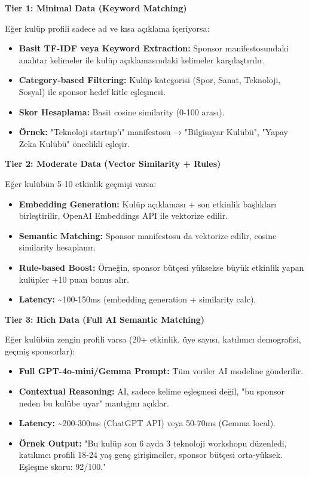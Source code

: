 \documentclass[a4paper,12pt]{report}
\begin{document}
\textbf{Tier 1: Minimal Data (Keyword Matching)}

Eğer kulüp profili sadece ad ve kısa açıklama içeriyorsa:
\begin{itemize}
    \item \textbf{Basit TF-IDF veya Keyword Extraction:} Sponsor manifestosundaki anahtar kelimeler ile kulüp açıklamasındaki kelimeler karşılaştırılır.
    \item \textbf{Category-based Filtering:} Kulüp kategorisi (Spor, Sanat, Teknoloji, Sosyal) ile sponsor hedef kitle eşleşmesi.
    \item \textbf{Skor Hesaplama:} Basit cosine similarity (0-100 arası).
    \item \textbf{Örnek:} "Teknoloji startup'ı" manifestosu → "Bilgisayar Kulübü", "Yapay Zeka Kulübü" öncelikli eşleşir.
\end{itemize}

\textbf{Tier 2: Moderate Data (Vector Similarity + Rules)}

Eğer kulübün 5-10 etkinlik geçmişi varsa:
\begin{itemize}
    \item \textbf{Embedding Generation:} Kulüp açıklaması + son etkinlik başlıkları birleştirilir, OpenAI Embeddings API ile vektorize edilir.
    \item \textbf{Semantic Matching:} Sponsor manifestosu da vektorize edilir, cosine similarity hesaplanır.
    \item \textbf{Rule-based Boost:} Örneğin, sponsor bütçesi yüksekse büyük etkinlik yapan kulüpler +10 puan bonus alır.
    \item \textbf{Latency:} \textasciitilde{}100-150ms (embedding generation + similarity calc).
\end{itemize}

\textbf{Tier 3: Rich Data (Full AI Semantic Matching)}

Eğer kulübün zengin profili varsa (20+ etkinlik, üye sayısı, katılımcı demografisi, geçmiş sponsorlar):
\begin{itemize}
    \item \textbf{Full GPT-4o-mini/Gemma Prompt:} Tüm veriler AI modeline gönderilir.
    \item \textbf{Contextual Reasoning:} AI, sadece kelime eşleşmesi değil, "bu sponsor neden bu kulübe uyar" mantığını açıklar.
    \item \textbf{Latency:} \textasciitilde{}200-300ms (ChatGPT API) veya 50-70ms (Gemma local).
    \item \textbf{Örnek Output:} "Bu kulüp son 6 ayda 3 teknoloji workshopu düzenledi, katılımcı profili 18-24 yaş genç girişimciler, sponsor bütçesi orta-yüksek. Eşleşme skoru: 92/100."
\end{itemize}
\end{document}
